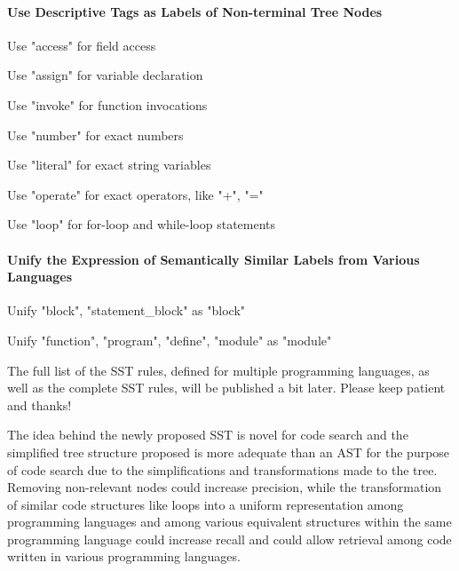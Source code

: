 \paragraph{Use Descriptive Tags as Labels of Non-terminal Tree Nodes}

\begin{compactenum}
\item Use "access" for field access
\item Use "assign" for variable declaration
\item Use "invoke" for function invocations
\item Use "number" for exact numbers
\item Use "literal" for exact string variables
\item Use "operate" for exact operators, like "+", "="
\item Use "loop" for for-loop and while-loop statements
\end{compactenum}

\paragraph{Unify the Expression of Semantically Similar Labels from Various Languages}

\begin{compactenum}
\item Unify "block", "statement\_block" as "block"
\item Unify "function", "program", "define", "module" as "module"
\end{compactenum}

The full list of the SST rules, defined for multiple programming languages, as well as the complete SST rules, will be published a bit later. Please keep patient and thanks!

The idea behind the newly proposed SST is novel for code search and the simplified tree structure proposed is more adequate than an AST for the purpose of code search due to the simplifications and transformations made to the tree. Removing non-relevant nodes could increase precision, while the transformation of similar code structures like loops into a uniform representation among programming languages and among various equivalent structures within the same programming language could increase recall and could allow retrieval among code written in various programming languages.
